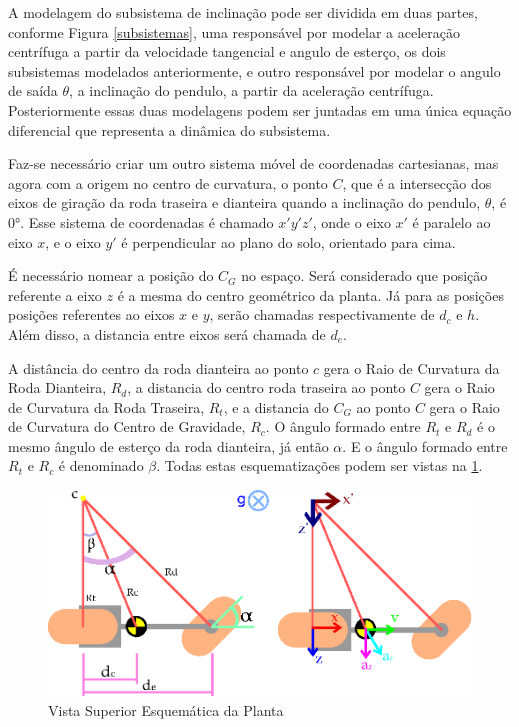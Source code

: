         A modelagem do subsistema de inclinação pode ser dividida em duas partes, conforme Figura \ref{subsistemas}, uma responsável por modelar a aceleração centrífuga a partir da velocidade tangencial e angulo de esterço, os dois subsistemas modelados anteriormente, e outro responsável por modelar o angulo de saída $\theta$, a inclinação do pendulo, a partir da aceleração centrífuga. Posteriormente essas duas modelagens podem ser juntadas em uma única equação diferencial que representa a dinâmica do subsistema.

	    Faz-se necessário criar um outro sistema móvel de coordenadas cartesianas, mas agora com a origem no centro de curvatura, o ponto $C$, que é a intersecção dos eixos de giração da roda traseira e dianteira quando a inclinação do pendulo, $\theta$, é $0°$. Esse sistema de coordenadas é chamado $x' y' z'$, onde o eixo $x'$ é paralelo ao eixo $x$, e o eixo $y'$ é perpendicular ao plano do solo, orientado para cima.
	    
	    É necessário nomear a posição do $C_G$ no espaço. Será considerado que posição referente a eixo $z$ é a mesma do centro geométrico da planta. Já para as posições posições referentes ao eixos $x$ e $y$, serão chamadas respectivamente de $d_c$ e $h$. Além disso, a distancia entre eixos será chamada de $d_e$. 
    
        A distância do centro da roda dianteira ao ponto $c$ gera o Raio de Curvatura da Roda Dianteira, $R_d$, a distancia do centro roda traseira ao ponto $C$ gera o Raio de Curvatura da Roda Traseira, $R_t$, e a distancia do $C_G$ ao ponto $C$ gera o Raio de Curvatura do Centro de Gravidade, $R_c$. O ângulo formado entre $R_t$ e $R_d$ é o mesmo ângulo de esterço da roda dianteira, já então $\alpha$. E o ângulo formado entre $R_t$ e $R_c$ é denominado $\beta$. Todas estas esquematizações podem ser vistas na \ref{img:vistasupesquematica}.
        
        \begin{figure}[h]
            \centering
            \includegraphics[width=15cm]{Imagens/cinematica.eps}
            \caption{Vista Superior Esquemática da Planta}
            \label{img:vistasupesquematica}
        \end{figure}
        
